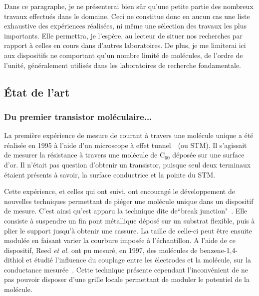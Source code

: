 Dans ce paragraphe, je ne présenterai bien sûr qu'une petite partie des nombreux travaux effectués dans le domaine. Ceci ne constitue donc en aucun cas une liste exhaustive des expériences réalisées, ni m\^eme une sélection des travaux les plus importants. Elle permettra, je l'espère, au lecteur de situer nos recherches par rapport à celles en cours dans d'autres laboratoires. De plus, je me limiterai ici aux dispositifs ne comportant qu'un nombre limité de molécules, de l'ordre de l'unité, généralement utilisés dans les laboratoires de recherche fondamentale.
\subsection{État de l'art}

\subsubsection*{Du premier transistor moléculaire...}
La première expérience de mesure de courant à travers une molécule unique a été réalisée en 1995 à l'aide d'un microscope à effet tunnel~\cite{Joachim1995}~(ou STM). Il s'agissait de mesurer la résistance à travers une molécule de C$_{60}$ déposée sur une surface d'or. Il n'était pas question d'obtenir un transistor, puisque seul deux terminaux étaient présents à savoir, la surface conductrice et la pointe du STM.

Cette expérience, et celles qui ont suivi, ont encouragé le développement de nouvelles techniques permettant de piéger une molécule unique dans un dispositif de mesure. C'est ainsi qu'est apparu la technique dite de``break junction"~\cite{Zhou1995}. Elle consiste à suspendre un fin pont métallique déposé sur un substrat flexible, puis à plier le support jusqu'à obtenir une cassure. La taille de celle-ci peut être ensuite modulée en faisant varier la courbure imposée à l'échantillon. A l'aide de ce dispositif, Reed \textit{et al.} ont pu mesuré, en 1997, des molécules de benzene-1,4-dithiol et étudié l'influence du couplage entre les électrodes et la molécule, sur la conductance mesurée~\cite{Reed1997}. Cette technique présente cependant l'inconvénient de ne pas pouvoir disposer d'une grille locale permettant de moduler le potentiel de la molécule.

